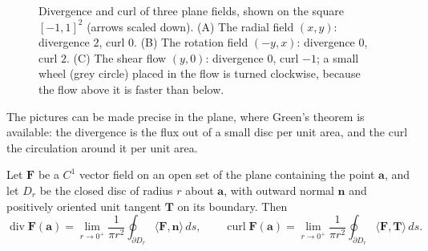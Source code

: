 \begin{figure}
{{{{}}\kern0pt}}{Divergence and curl of three plane fields, shown on the square $[-1,1]^2$ (arrows scaled down). (A) The radial field $(x,y)$: divergence $2$, curl $0$. (B) The rotation field $(-y,x)$: divergence $0$, curl $2$. (C) The shear flow $(y,0)$: divergence $0$, curl $-1$; a small wheel (grey circle) placed in the flow is turned clockwise, because the flow above it is faster than below.\label{fig:div-curl}}
\end{figure}

The pictures can be made precise in the plane, where Green's theorem is available: the divergence is the flux out of a small disc per unit area, and the curl the circulation around it per unit area.

\begin{proposition}
\label{prop:div-curl-limits}
Let $\mathbf F$ be a $C^1$ vector field on an open set of the plane containing the point $\mathbf a$, and let $D_r$ be the closed disc of radius $r$ about $\mathbf a$, with outward normal $\mathbf n$ and positively oriented unit tangent $\mathbf T$ on its boundary. Then
\[
\operatorname{div}\mathbf F(\mathbf a)=\lim_{r\to0^+}\frac1{\pi r^2}\oint_{\partial D_r}\langle\mathbf F,\mathbf n\rangle\,ds,\qquad\operatorname{curl}\mathbf F(\mathbf a)=\lim_{r\to0^+}\frac1{\pi r^2}\oint_{\partial D_r}\langle\mathbf F,\mathbf T\rangle\,ds .
\]
\end{proposition}

